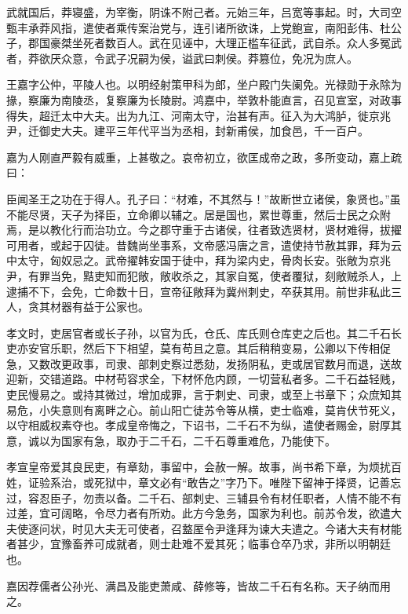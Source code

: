 \documentclass[]{article}
\begin{document}
武就国后，莽寝盛，为宰衡，阴诛不附己者。元始三年，吕宽等事起。时，大司空甄丰承莽风指，遣使者乘传案治党与，连引诸所欲诛，上党鲍宣，南阳彭伟、杜公子，郡国豪桀坐死者数百人。武在见诬中，大理正槛车征武，武自杀。众人多冤武者，莽欲厌众意，令武子况嗣为侯，谥武曰刺侯。莽篡位，免况为庶人。

王嘉字公仲，平陵人也。以明经射策甲科为郎，坐户殿门失阑免。光禄勋于永除为掾，察廉为南陵丞，复察廉为长陵尉。鸿嘉中，举敦朴能直言，召见宣室，对政事得失，超迁太中大夫。出为九江、河南太守，治甚有声。征入为大鸿胪，徙京兆尹，迁御史大夫。建平三年代平当为丞相，封新甫侯，加食邑，千一百户。

嘉为人刚直严毅有威重，上甚敬之。哀帝初立，欲匡成帝之政，多所变动，嘉上疏曰：

臣闻圣王之功在于得人。孔子曰：``材难，不其然与！''故断世立诸侯，象贤也。''虽不能尽贤，天子为择臣，立命卿以辅之。居是国也，累世尊重，然后士民之众附焉，是以教化行而治功立。今之郡守重于古诸侯，往者致选贤材，贤材难得，拔擢可用者，或起于囚徒。昔魏尚坐事系，文帝感冯唐之言，遣使持节赦其罪，拜为云中太守，匈奴忌之。武帝擢韩安国于徒中，拜为梁内史，骨肉长安。张敞为京兆尹，有罪当免，黠吏知而犯敞，敞收杀之，其家自冤，使者覆狱，刻敞贼杀人，上逮捕不下，会免，亡命数十日，宣帝征敞拜为冀州刺史，卒获其用。前世非私此三人，贪其材器有益于公家也。

孝文时，吏居官者或长子孙，以官为氏，仓氏、库氏则仓库吏之后也。其二千石长吏亦安官乐职，然后下下相望，莫有苟且之意。其后稍稍变易，公卿以下传相促急，又数改更政事，司隶、部刺史察过悉劾，发扬阴私，吏或居官数月而退，送故迎新，交错道路。中材苟容求全，下材怀危内顾，一切营私者多。二千石益轻贱，吏民慢易之。或持其微过，增加成罪，言于刺史、司隶，或至上书章下；众庶知其易危，小失意则有离畔之心。前山阳亡徒苏令等从横，吏士临难，莫肯伏节死义，以守相威权素夺也。孝成皇帝悔之，下诏书，二千石不为纵，遣使者赐金，尉厚其意，诚以为国家有急，取办于二千石，二千石尊重难危，乃能使下。

孝宣皇帝爱其良民吏，有章劾，事留中，会赦一解。故事，尚书希下章，为烦扰百姓，证验系治，或死狱中，章文必有``敢告之''字乃下。唯陛下留神于择贤，记善忘过，容忍臣子，勿责以备。二千石、部刺史、三辅县令有材任职者，人情不能不有过差，宜可阔略，令尽力者有所劝。此方今急务，国家为利也。前苏令发，欲遣大夫使逐问状，时见大夫无可使者，召盩厔令尹逢拜为谏大夫遣之。今诸大夫有材能者甚少，宜豫畜养可成就者，则士赴难不爱其死；临事仓卒乃求，非所以明朝廷也。

嘉因荐儒者公孙光、满昌及能吏萧咸、薛修等，皆故二千石有名称。天子纳而用之。
\end{document}
